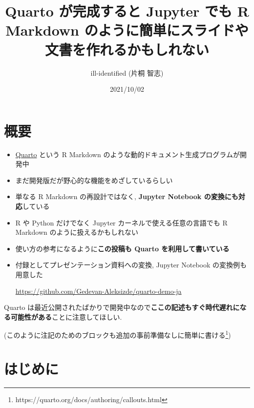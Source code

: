 \documentclass[
  letterpaper,
  DIV=11,
  pandoc,
  ja=standard,
  jafont=noto-otf]{bxjsarticle}
\title{Quarto が完成すると Jupyter でも R Markdown
のように簡単にスライドや文書を作れるかもしれない}
\author{ill-identified (片桐 智志)}
\date{2021/10/02}
\begin{document}
\maketitle

{
\hypersetup{linkcolor=}
\setcounter{tocdepth}{3}
\tableofcontents
}
\hypertarget{ux6982ux8981}{%
\section*{概要}\label{ux6982ux8981}}

\begin{itemize}
\item
  \href{https://quarto.org/}{Quarto} という R Markdown
  のような動的ドキュメント生成プログラムが開発中
\item
  まだ開発版だが野心的な機能をめざしているらしい
\item
  単なる R Markdown の再設計ではなく, \textbf{Jupyter Notebook
  の変換にも対応}している
\item
  R や Python だけでなく Jupyter カーネルで使える任意の言語でも R
  Markdown のように扱えるかもしれない
\item
  使い方の参考になるように\textbf{この投稿も Quarto
  を利用して書いている}
\item
  付録としてプレゼンテーション資料への変換, Jupyter Notebook
  の変換例も用意した

  \url{https://github.com/Gedevan-Aleksizde/quarto-demo-ja}
\end{itemize}

\begin{tcolorbox}[titlerule=0mm, coltitle=black, left=2mm, bottomtitle=1mm, title=\textcolor{quarto-callout-caution-color}{\faFire}\hspace{0.5em}注意, bottomrule=.15mm, arc=.35mm, toptitle=1mm, colback=white, leftrule=.75mm, rightrule=.15mm, toprule=.15mm, colframe=quarto-callout-caution-color, colbacktitle=quarto-callout-caution-color!10!white]
Quarto
は最近公開されたばかりで開発中なので\textbf{ここの記述もすぐ時代遅れになる可能性がある}ことに注意してほしい.

(このように注記のためのブロックも追加の事前準備なしに簡単に書ける\footnote{https://quarto.org/docs/authoring/callouts.html})
\end{tcolorbox}

\hypertarget{ux306fux3058ux3081ux306b}{%
\section{はじめに}\label{ux306fux3058ux3081ux306b}}
\end{document}

